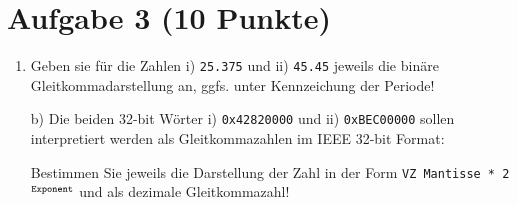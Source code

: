 \section*{Aufgabe 3 (10 Punkte)}

\begin{enumerate}[label={a)}, leftmargin=*]
\item Geben sie für die Zahlen i) \texttt{25.375} und ii) \texttt{45.45} jeweils die binäre Gleitkommadarstellung an, ggfs. unter Kennzeichung der Periode!
\item[b)] Die beiden 32-bit Wörter i) \texttt{0x42820000} und ii) \texttt{0xBEC00000} sollen interpretiert werden als Gleitkommazahlen im IEEE 32-bit Format:

\begin{table}[h]
\centering
{}
\end{table}

Bestimmen Sie jeweils die Darstellung der Zahl in der Form \texttt{VZ Mantisse * 2}$^\text{\texttt{Exponent}}$ und als dezimale Gleitkommazahl!
\end{enumerate}

